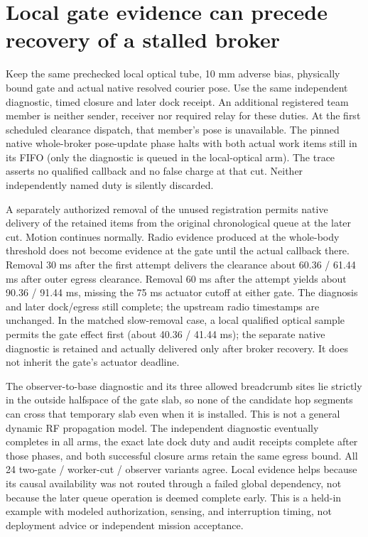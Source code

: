 \documentclass{article}
\begin{document}
\section*{Local gate evidence can precede recovery of a stalled broker}
Keep the same prechecked local optical tube, 10 mm adverse bias,
physically bound gate and actual native resolved courier pose.
Use the same independent diagnostic, timed closure and later
dock receipt. An additional registered team member is neither
sender, receiver nor required relay for these duties. At the
first scheduled clearance dispatch, that member's pose is
unavailable. The pinned native whole-broker pose-update phase
halts with both actual work items still in its FIFO (only the
diagnostic is queued in the local-optical arm). The trace
asserts no qualified callback and no false charge at that cut.
Neither independently named duty is silently discarded.

A separately authorized removal of the unused registration permits
native delivery of the retained items from the original
chronological queue at the later cut. Motion continues normally.
Radio evidence produced at the whole-body threshold does not
become evidence at the gate until the actual callback there.
Removal 30 ms after the first attempt delivers the clearance
about 60.36 / 61.44 ms after outer egress clearance. Removal
60 ms after the attempt yields about 90.36 / 91.44 ms, missing
the 75 ms actuator cutoff at either gate. The diagnosis and later
dock/egress still complete; the upstream radio timestamps are
unchanged. In the matched slow-removal case, a local qualified
optical sample permits the gate effect first (about
40.36 / 41.44 ms); the separate native diagnostic is
retained and actually delivered only after broker recovery.
It does not inherit the gate's actuator deadline.

The observer-to-base diagnostic and its three allowed breadcrumb
sites lie strictly in the outside halfspace of the gate slab, so
none of the candidate hop segments can cross that temporary
slab even when it is installed. This is not a general dynamic
RF propagation model. The independent diagnostic eventually
completes in all arms, the exact late dock duty and audit receipts
complete after those phases, and both successful closure arms
retain the same egress bound. All 24 two-gate / worker-cut /
observer variants agree. Local evidence helps because its causal
availability was not routed through a failed global dependency,
not because the later queue operation is deemed complete early.
This is a held-in example with modeled authorization,
sensing, and interruption timing, not deployment advice or
independent mission acceptance.
\end{document}
